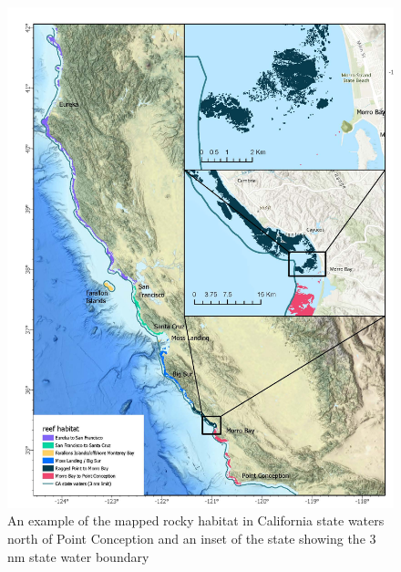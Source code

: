 \documentclass[
  authoryear,
  preprint,
  3p]{elsarticle}
\begin{document}
\begin{figure}

{\centering \includegraphics{figures/map.jpg}

}

\caption{\label{fig-map}An example of the mapped rocky habitat in
California state waters north of Point Conception and an inset of the
state showing the 3 nm state water boundary}

\end{figure}
\end{document}
